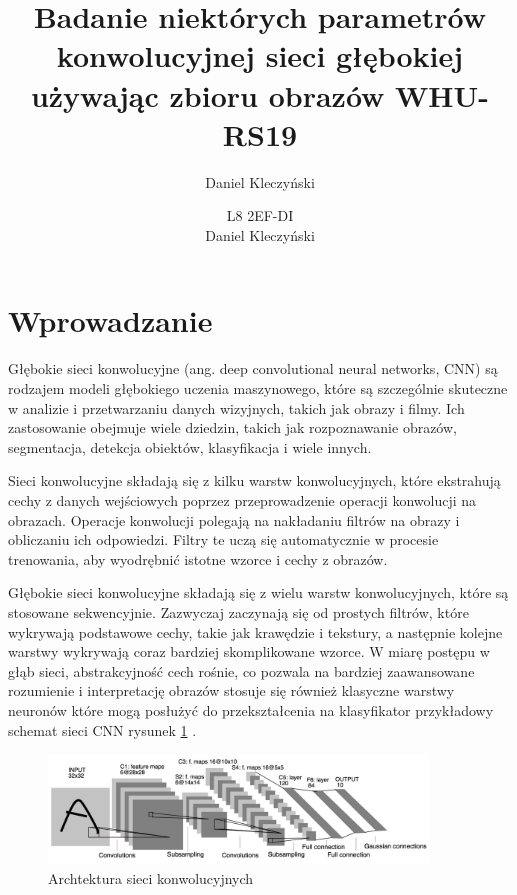 \documentclass[12pt,twoside]{article}
\author{Daniel Kleczyński}
\title{Badanie niektórych parametrów konwolucyjnej sieci głębokiej używając zbioru obrazów WHU-RS19 }
\begin{document}
\author{L8 2EF-DI \\ Daniel Kleczyński}

\maketitle



\tableofcontents

\clearpage



\section*{Wprowadzanie}
%
Głębokie sieci konwolucyjne (ang. deep convolutional neural networks, CNN) są rodzajem modeli głębokiego uczenia maszynowego, które są szczególnie skuteczne w analizie i przetwarzaniu danych wizyjnych, takich jak obrazy i filmy. Ich zastosowanie obejmuje wiele dziedzin, takich jak rozpoznawanie obrazów, segmentacja, detekcja obiektów, klasyfikacja i wiele innych.

Sieci konwolucyjne składają się z  kilku warstw konwolucyjnych, które ekstrahują cechy z danych wejściowych poprzez przeprowadzenie operacji konwolucji na obrazach. Operacje konwolucji polegają na nakładaniu filtrów na obrazy i obliczaniu ich odpowiedzi. Filtry te uczą się automatycznie w procesie trenowania, aby wyodrębnić istotne wzorce i cechy z obrazów.

Głębokie sieci konwolucyjne składają się z wielu warstw konwolucyjnych, które są stosowane sekwencyjnie. Zazwyczaj zaczynają się od prostych filtrów, które wykrywają podstawowe cechy, takie jak krawędzie i tekstury, a następnie kolejne warstwy wykrywają coraz bardziej skomplikowane wzorce. W miarę postępu w głąb sieci, abstrakcyjność cech rośnie, co pozwala na bardziej zaawansowane rozumienie i interpretację obrazów stosuje się również klasyczne warstwy neuronów które mogą posłużyć do przekształcenia na klasyfikator przykładowy schemat sieci CNN rysunek \ref*{fig:klasyczny_CNN}  .
\begin{figure}[ht]
	\centering
	\includegraphics[width=0.9\textwidth]{figures/klasyczyn_CNN.png}
	\caption{Archtektura sieci konwolucyjnych}
	\label{fig:klasyczny_CNN}
  \end{figure}
\end{document}
